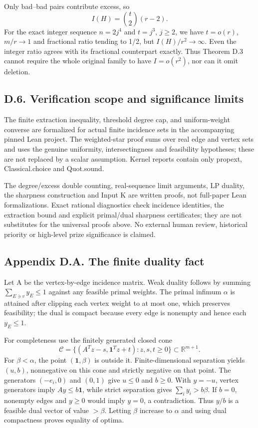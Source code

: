 \documentclass[
  11pt,
]{article}
\begin{document}
Only bad--bad pairs contribute excess, so \[
                         I(H)=\binom t2(r-2).              \tag{D.15}
\] For the exact integer sequence \(n=2j^4\) and \(t=j^3\), \(j\ge2\),
we have \(t=o(r)\), \(m/r\to1\) and fractional ratio tending to 1/2, but
\(I(H)/r^2\to\infty\). Even the integer ratio agrees with its fractional
counterpart exactly. Thus Theorem D.3 cannot require the whole original
family to have \(I=o(r^2)\), nor can it omit deletion.

\subsection{D.6. Verification scope and significance
limits}\label{d.6.-verification-scope-and-significance-limits}

The finite extraction inequality, threshold degree cap, and
uniform-weight converse are formalized for actual finite incidence sets
in the accompanying pinned Lean project. The weighted-star proof sums
over real edge and vertex sets and uses the genuine uniformity,
intersectingness and feasibility hypotheses; these are not replaced by a
scalar assumption. Kernel reports contain only propext, Classical.choice
and Quot.sound.

The degree/excess double counting, real-sequence limit arguments, LP
duality, the sharpness construction and Input K are written proofs, not
full-paper Lean formalizations. Exact rational diagnostics check
incidence identities, the extraction bound and explicit primal/dual
sharpness certificates; they are not substitutes for the universal
proofs above. No external human review, historical priority or
high-level prize significance is claimed.

\subsection{Appendix D.A. The finite duality
fact}\label{appendix-d.a.-the-finite-duality-fact}

Let A be the vertex-by-edge incidence matrix. Weak duality follows by
summing \(\sum_{E\ni v}y_E\le1\) against any feasible primal weights.
The primal infimum \(\alpha\) is attained after clipping each vertex
weight to at most one, which preserves feasibility; the dual is compact
because every edge is nonempty and hence each \(y_E\le1\).

For completeness use the finitely generated closed cone \[
 \mathcal C=\{(A^Tz-s,\mathbf1^Tz+t):z,s,t\ge0\}
                         \subset\mathbb R^{m+1}.
\] For \(\beta<\alpha\), the point \((\mathbf1,\beta)\) is outside it.
Finite-dimensional separation yields \((u,b)\), nonnegative on this cone
and strictly negative on that point. The generators \((-e_i,0)\) and
\((0,1)\) give \(u\le0\) and \(b\ge0\). With \(y=-u\), vertex generators
imply \(Ay\le b\mathbf1\), while strict separation gives
\(\sum_i y_i>b\beta\). If \(b=0\), nonempty edges and \(y\ge0\) would
imply \(y=0\), a contradiction. Thus \(y/b\) is a feasible dual vector
of value \(>\beta\). Letting \(\beta\) increase to \(\alpha\) and using
dual compactness proves equality of optima.
\end{document}
